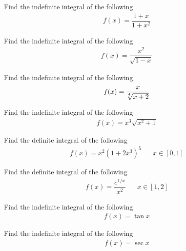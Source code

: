 \begin{exercise}
Find the indefinite integral of the following 
\begin{align*}
    f(x) = \dfrac{1+x}{1 + x^{2}}
\end{align*}
\end{exercise}

\begin{exercise}
Find the indefinite integral of the following 
\begin{align*}
    f(x) = \dfrac{x^{2}}{\sqrt{1 - x}}
\end{align*}
\end{exercise}

\begin{exercise}
Find the indefinite integral of the following 
\begin{align*}
    f(x) = \dfrac{x}{\sqrt[\leftroot{2}\uproot{2}4]{x + 2}}
\end{align*}
\end{exercise}

\begin{exercise}
Find the indefinite integral of the following 
\begin{align*}
    f(x) = x^{3} \sqrt{x^{2} + 1}
\end{align*}
\end{exercise}

\begin{exercise}
Find the definite integral of the following 
\begin{align*}
    f(x) = x^{2} (1 + 2x^{3})^{5} \hspace{20pt} x \in [0, 1]
\end{align*}
\end{exercise}

\begin{exercise}
Find the definite integral of the following 
\begin{align*}
    f(x) = \dfrac{e^{1/x}}{x^{2}} \hspace{20pt} x \in [1, 2]
\end{align*}
\end{exercise}

\begin{exercise}
Find the indefinite integral of the following
\begin{align*}
    f(x) = \tan x
\end{align*}
\end{exercise}

\begin{exercise}
Find the indefinite integral of the following
\begin{align*}
    f(x) = \sec x
\end{align*}
\end{exercise}

